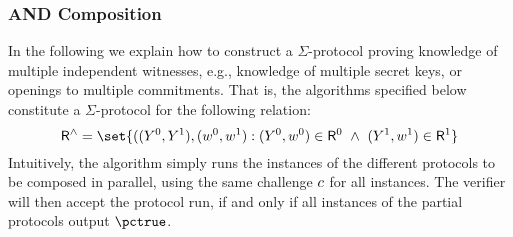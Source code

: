 \documentclass[runningheads,11pt]{article}
\begin{document}
  \subsubsection{AND Composition}
  In the following we explain how to construct a $\Sigma$-protocol proving knowledge of multiple independent witnesses, e.g., knowledge of multiple secret keys, or openings to multiple commitments.
  That is, the algorithms specified below constitute a $\Sigma$-protocol for the following relation:
\[
  \relation^\land = \set{
    ((\statement^0,\statement^1),(\witness^0,\witness^1) : (\statement^0,\witness^0)\in \relation^0 ~\land~ (\statement^1,\witness^1)\in\relation^1}
\]
  Intuitively, the algorithm simply runs the instances of the different protocols to be composed in parallel, using the same challenge $c$ for all instances.
	The verifier will then accept the protocol run, if and only if all instances of the partial protocols output $\accept$.

\end{document}
